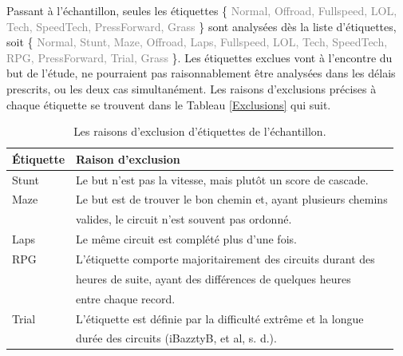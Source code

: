 \documentclass[
  oneside,
  open=any]{scrreprt}
\begin{document}
Passant à l'échantillon, seules les étiquettes \{
\textcolor{gray}{Normal, Offroad, Fullspeed, LOL, Tech, SpeedTech, PressForward, Grass}
\} sont analysées dès la liste d'étiquettes, soit \{
\textcolor{gray}{Normal, Stunt, Maze, Offroad, Laps, Fullspeed, LOL, Tech, SpeedTech, RPG, PressForward, Trial, Grass}
\}. Les étiquettes exclues vont à l'encontre du but de l'étude, ne
pourraient pas raisonnablement être analysées dans les délais prescrits,
ou les deux cas simultanément. Les raisons d'exclusions précises à
chaque étiquette se trouvent dans le Tableau \ref{Exclusions} qui suit.

\begin{table}[H]
\centering
  \begin{tabular}{ll}
  \toprule
  Étiquette & Raison d'exclusion \\
  \midrule
  Stunt & Le but n’est pas la vitesse, mais plutôt un score de cascade. \\[10pt]
  Maze  & Le but est de trouver le bon chemin et, ayant plusieurs chemins \\
        & valides, le circuit n’est souvent pas ordonné. \\[10pt]
  Laps  & Le même circuit est complété plus d’une fois. \\[10pt]
  RPG   & L’étiquette comporte majoritairement des circuits durant des \\
        & heures de suite, ayant des différences de quelques heures \\
        & entre chaque record. \\[10pt]
  Trial & L’étiquette est définie par la difficulté extrême et la longue \\
        & durée des circuits (iBazztyB, et al, s. d.). \\
  \bottomrule
  \end{tabular}
\caption{Les raisons d’exclusion d’étiquettes de l’échantillon.}

\end{table}
\end{document}
